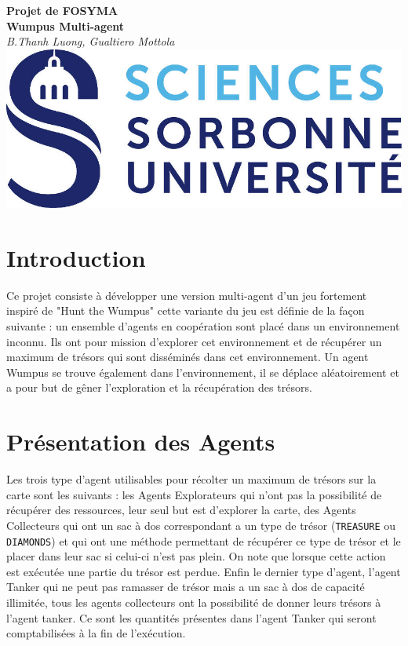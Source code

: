 \documentclass[10pt]{article}
\begin{document}
\begin{center}
	\textbf{\huge Projet de FOSYMA\\[.5cm] Wumpus Multi-agent}\\[.5cm]
	\vspace{1.5cm}
	\textit{\Large B.Thanh Luong, Gualtiero Mottola}\\
	\vspace{1.5cm}
	\includegraphics{logo}
	\vspace{1.5cm}
	\tableofcontents
\end{center}

\newpage

\section{Introduction}
	Ce projet consiste à développer une version multi-agent d'un jeu fortement inspiré de "Hunt the Wumpus" cette variante du jeu est définie de la façon suivante : un ensemble d'agents en coopération sont placé dans un environnement inconnu. Ils ont pour mission d'explorer cet environnement et de récupérer un maximum de trésors qui sont disséminés dans cet environnement. Un agent Wumpus se trouve également dans l'environnement, il se déplace aléatoirement et a pour but de gêner l'exploration et la récupération des trésors.
	
\section{Présentation des Agents}
	Les trois type d'agent utilisables pour récolter un maximum de trésors sur la carte sont les suivants : les Agents Explorateurs qui n'ont pas la possibilité de récupérer des ressources, leur seul but est d'explorer la carte, des Agents Collecteurs qui ont un sac à dos correspondant a un type de trésor (\texttt{TREASURE} ou \texttt{DIAMONDS}) et qui ont une méthode permettant de récupérer ce type de trésor et le placer dans leur sac si celui-ci n'est pas plein. On note que lorsque cette action est exécutée une partie du trésor est perdue. Enfin le dernier type d'agent, l'agent Tanker qui ne peut pas ramasser de trésor mais a un sac à dos de capacité illimitée, tous les agents collecteurs ont la possibilité de donner leurs trésors à l'agent tanker. Ce sont les quantités présentes dans l'agent Tanker qui seront comptabilisées à la fin de l'exécution.
\end{document}
